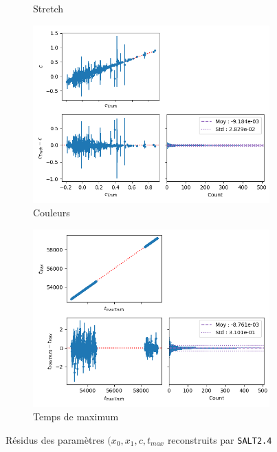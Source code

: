 \documentclass{book}
\def\saltd{\texttt{SALT2.4}\xspace}
\begin{document}
\begin{figure}
\begin{subfigure}{0.45\textwidth}
		\caption{Stretch}
		\label{fig:salt_x1}
	\end{subfigure}
	\hfill
	\begin{subfigure}{0.45\textwidth}
		\centering
		\includegraphics[width=\textwidth]{figures/salt_c.png}
		\caption{Couleurs}
		\label{fig:salt_c}
	\end{subfigure}
	\hfill
	\begin{subfigure}{0.45\textwidth}
		\centering
		\includegraphics[width=\textwidth]{figures/salt_tmax.png}
		\caption{Temps de maximum }
		\label{fig:salt_tmax}
	\end{subfigure}
	\caption{Résidus des paramètres $(x_0, x_1, c, t_{max}$ reconstruits par \saltd}
	\label{fig:salt_residuals}
\end{figure}
\end{document}

